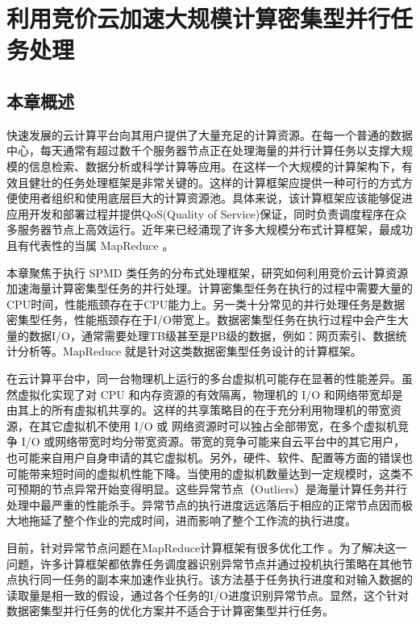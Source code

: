 \chapter{利用竞价云加速大规模计算密集型并行任务处理}
\label{cha:task}

\section{本章概述}
\label{sec:no2_intro}
快速发展的云计算平台向其用户提供了大量充足的计算资源。在每一个普通的数据中心，每天通常有超过数千个服务器节点正在处理海量的并行计算任务以支撑大规模的信息检索、数据分析或科学计算等应用。在这样一个大规模的计算架构下，有效且健壮的任务处理框架是非常关键的。这样的计算框架应提供一种可行的方式方便使用者组织和使用底层巨大的计算资源池。具体来说，该计算框架应该能够促进应用开发和部署过程并提供QoS(Quality of Service)保证，同时负责调度程序在众多服务器节点上高效运行。近年来已经涌现了许多大规模分布式计算框架，最成功且有代表性的当属 MapReduce \cite{Dean:2004:MSD:1251254.1251264}。

本章聚焦于执行 SPMD 类任务的分布式处理框架，研究如何利用竞价云计算资源加速海量计算密集型任务的并行处理。计算密集型任务在执行的过程中需要大量的CPU时间，性能瓶颈存在于CPU能力上。另一类十分常见的并行处理任务是数据密集型任务，性能瓶颈存在于I/O带宽上。数据密集型任务在执行过程中会产生大量的数据I/O，通常需要处理TB级甚至是PB级的数据，例如：网页索引、数据统计分析等。MapReduce 就是针对这类数据密集型任务设计的计算框架。

在云计算平台中，同一台物理机上运行的多台虚拟机可能存在显著的性能差异。虽然虚拟化实现了对 CPU 和内存资源的有效隔离，物理机的 I/O 和网络带宽却是由其上的所有虚拟机共享的。这样的共享策略目的在于充分利用物理机的带宽资源，在其它虚拟机不使用 I/O 或 网络资源时可以独占全部带宽，在多个虚拟机竞争 I/O 或网络带宽时均分带宽资源。带宽的竞争可能来自云平台中的其它用户，也可能来自用户自身申请的其它虚拟机。另外，硬件、软件、配置等方面的错误也可能带来短时间的虚拟机性能下降。当使用的虚拟机数量达到一定规模时，这类不可预期的节点异常开始变得明显。这些异常节点（Outliers）是海量计算任务并行处理中最严重的性能杀手。异常节点的执行进度远远落后于相应的正常节点因而极大地拖延了整个作业的完成时间，进而影响了整个工作流的执行进度。

目前，针对异常节点问题在MapReduce计算框架有很多优化工作 \cite{Zaharia:2008:IMP:1855741.1855744, Ananthanarayanan:2010:ROM:1924943.1924962}。为了解决这一问题，许多计算框架都依靠任务调度器识别异常节点并通过投机执行策略在其他节点执行同一任务的副本来加速作业执行。该方法基于任务执行进度和对输入数据的读取量是相一致的假设，通过各个任务的I/O进度识别异常节点。显然，这个针对数据密集型并行任务的优化方案并不适合于计算密集型并行任务。

